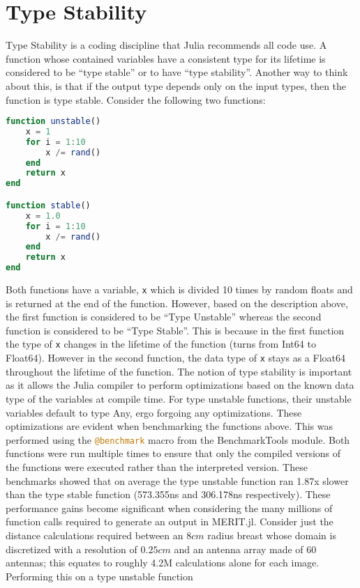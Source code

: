 \section{Type Stability}
Type Stability is a coding discipline that Julia recommends all code use. A function whose contained variables have a
consistent type for its lifetime is considered to be ``type stable'' or to have ``type stability''. Another way to think
about this, is that if the output type depends only on the input types, then the function is type stable. Consider the
following two functions: 
\begin{lstlisting}[language=Julia]
function unstable()
    x = 1
    for i = 1:10
        x /= rand()
    end
    return x
end

function stable()
    x = 1.0
    for i = 1:10
        x /= rand()
    end
    return x
end
\end{lstlisting}
Both functions have a variable, \lstinline[language=Julia]{x} which is divided 10 times by random floats and is returned
at the end of the function. However, based on the description above, the first function is considered to be ``Type
Unstable'' whereas the second function is considered to be ``Type Stable''. This is because in the first function the
type of \lstinline[language=Julia]{x} changes in the lifetime of the function (turns from Int64 to Float64). However in
the second function, the data type of \lstinline[language=Julia]{x} stays as a Float64 throughout the lifetime of the
function. The notion of type stability is important as it allows the Julia compiler to perform optimizations based on
the known data type of the variables at compile time. For type unstable functions, their unstable variables default to
type Any, ergo forgoing any optimizations. These optimizations are evident when benchmarking the functions above. This
was performed using the \lstinline[language=Julia]{@benchmark} macro from the BenchmarkTools module. Both functions were
run multiple times to ensure that only the compiled versions of the functions were executed rather than the interpreted
version. These benchmarks showed that on average the type unstable function ran 1.87x slower than the type stable
function (573.355ns and 306.178ns respectively). These performance gains become significant when considering the many
millions of function calls required to generate an output in MERIT.jl. Consider just the distance calculations required
between an $8cm$ radius breast whose domain is discretized with a resolution of $0.25cm$ and an antenna array made of 60
antennas; this equates to roughly 4.2M calculations alone for each image. Performing this on a type unstable function
